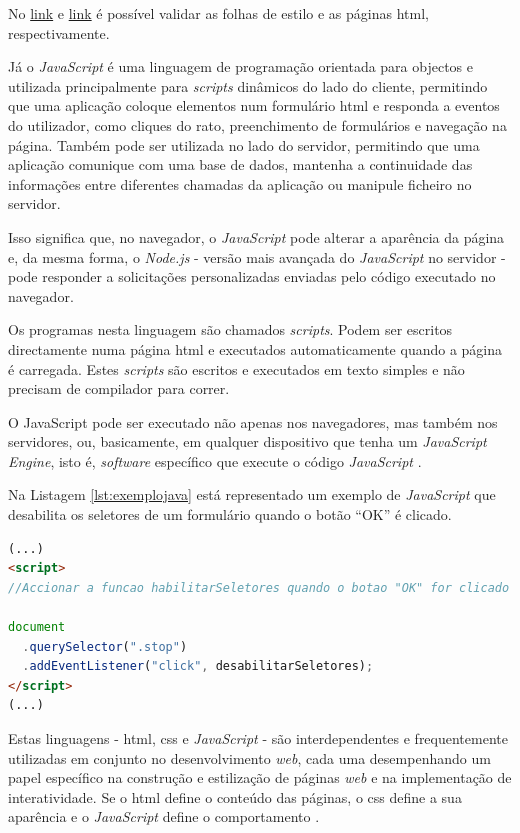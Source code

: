 No \href{https://jigsaw.w3.org/css-validator/}{link} e \href{https://validator.w3.org/}{link} é possível validar as folhas de estilo e as páginas \acrshort{html}, respectivamente.

Já o \textit{JavaScript} é uma linguagem de programação orientada para objectos e utilizada principalmente para \textit{scripts} dinâmicos do lado do cliente, permitindo que uma aplicação coloque elementos num formulário \acrshort{html} e responda a eventos do utilizador, como cliques do rato, preenchimento de formulários e navegação na página. Também pode ser utilizada no lado do servidor, permitindo que uma aplicação comunique com uma base de dados, mantenha a continuidade das informações entre diferentes chamadas da aplicação ou manipule ficheiro no servidor.

Isso significa que, no navegador, o \textit{JavaScript} pode alterar a aparência da página e, da mesma forma, o \textit{Node.js} - versão mais avançada do \textit{JavaScript} no servidor - pode responder a solicitações personalizadas enviadas pelo código executado no navegador.

Os programas nesta linguagem são chamados \textit{scripts}. Podem ser escritos directamente numa página \acrshort{html} e executados automaticamente quando a página é carregada. Estes \textit{scripts} são escritos e executados em texto simples e não precisam de compilador para correr.

O JavaScript pode ser executado não apenas nos navegadores, mas também nos servidores, ou, basicamente, em qualquer dispositivo que tenha um \textit{JavaScript Engine}, isto é, \textit{software} específico que execute o código \textit{JavaScript} \cite{JavaScriptRef}.

Na Listagem \ref{lst:exemplojava} está representado um exemplo de \textit{JavaScript} que desabilita os seletores de um formulário quando o botão ``OK'' é clicado.

\begin{minipage}{0.9\linewidth}
    \begin{lstlisting}[language=HTML, caption=Exemplo de \textit{JavaScript}, label=lst:exemplojava]
(...)
<script>
//Accionar a funcao habilitarSeletores quando o botao "OK" for clicado

document
  .querySelector(".stop")
  .addEventListener("click", desabilitarSeletores);
</script>
(...)
	\end{lstlisting}
\end{minipage}


Estas linguagens - \acrshort{html}, \acrshort{css} e \textit{JavaScript} - são interdependentes e frequentemente utilizadas em conjunto no desenvolvimento \textit{web}, cada uma desempenhando um papel específico na construção e estilização de páginas \textit{web} e na implementação de interatividade. Se o \acrshort{html} define o conteúdo das páginas, o \acrshort{css} define a sua aparência e o \textit{JavaScript} define o comportamento \cite{JavaScript}.


